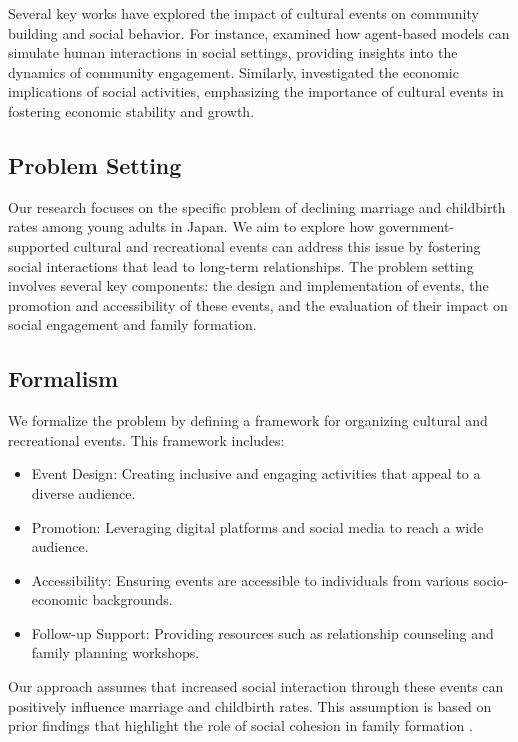 \documentclass{article} %
\begin{document}
Several key works have explored the impact of cultural events on community building and social behavior. For instance, \citet{liu2023agentbench} examined how agent-based models can simulate human interactions in social settings, providing insights into the dynamics of community engagement. Similarly, \citet{poledna2023economic} investigated the economic implications of social activities, emphasizing the importance of cultural events in fostering economic stability and growth.

\subsection{Problem Setting}
Our research focuses on the specific problem of declining marriage and childbirth rates among young adults in Japan. We aim to explore how government-supported cultural and recreational events can address this issue by fostering social interactions that lead to long-term relationships. The problem setting involves several key components: the design and implementation of events, the promotion and accessibility of these events, and the evaluation of their impact on social engagement and family formation.

\subsection{Formalism}
We formalize the problem by defining a framework for organizing cultural and recreational events. This framework includes:
\begin{itemize}
    \item Event Design: Creating inclusive and engaging activities that appeal to a diverse audience.
    \item Promotion: Leveraging digital platforms and social media to reach a wide audience.
    \item Accessibility: Ensuring events are accessible to individuals from various socio-economic backgrounds.
    \item Follow-up Support: Providing resources such as relationship counseling and family planning workshops.
\end{itemize}
Our approach assumes that increased social interaction through these events can positively influence marriage and childbirth rates. This assumption is based on prior findings that highlight the role of social cohesion in family formation \citep{west2023agent, zhou2023peer}.
\end{document}

